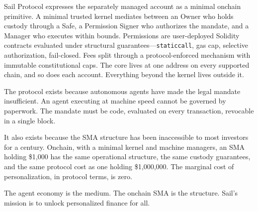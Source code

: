 \documentclass[11pt]{article}
\begin{document}
Sail Protocol expresses the separately managed account as a minimal onchain primitive. A minimal trusted kernel mediates between an Owner who holds custody through a Safe, a Permission Signer who authorizes the mandate, and a Manager who executes within bounds. Permissions are user-deployed Solidity contracts evaluated under structural guarantees---\texttt{staticcall}, gas cap, selective authorization, fail-closed. Fees split through a protocol-enforced mechanism with immutable constitutional caps. The core lives at one address on every supported chain, and so does each account. Everything beyond the kernel lives outside it.

The protocol exists because autonomous agents have made the legal mandate insufficient. An agent executing at machine speed cannot be governed by paperwork. The mandate must be code, evaluated on every transaction, revocable in a single block.

It also exists because the SMA structure has been inaccessible to most investors for a century. Onchain, with a minimal kernel and machine managers, an SMA holding \$1{,}000 has the same operational structure, the same custody guarantees, and the same protocol cost as one holding \$1{,}000{,}000. The marginal cost of personalization, in protocol terms, is zero.

The agent economy is the medium. The onchain SMA is the structure. Sail's mission is to unlock personalized finance for all.
\end{document}
